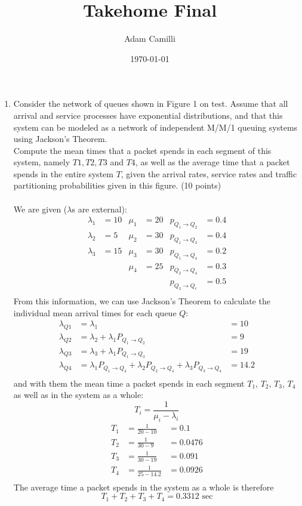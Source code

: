 \documentclass[12pt]{article}
\begin{document}
\title{Takehome Final}
\author{Adam Camilli}
\date{\today}
\maketitle

\begin{enumerate}

\item Consider the network of queues shown in Figure 1 on test. Assume that all arrival and service processes have exponential distributions, and that this system can be modeled as a network of independent M/M/1 queuing systems using Jackson's Theorem. \\
Compute the mean times that a packet spends in each segment of this system, namely $T1 ,T2, T3$ and $T4$,  as well as the average time that a packet spends in the entire system $T$, 
given the arrival rates, service rates and traffic partitioning probabilities given in this figure. (10 points) \\ \\
We are given ($\lambda$s are external):
\begin{align*}
   \lambda_1 &= 10 & \mu_1 &= 20 & p_{Q_1 \rightarrow Q_2} &= 0.4 \\
   \lambda_2 &= 5 & \mu_2 &= 30 & p_{Q_1 \rightarrow Q_3} &= 0.4 \\
   \lambda_3 &= 15 & \mu_3 &= 30 & p_{Q_1 \rightarrow Q_4} &= 0.2 \\
             &\text{}  & \mu_4 &= 25 & p_{Q_2 \rightarrow Q_4} &= 0.3 \\
             &\text{}  & &\text{} &  p_{Q_3 \rightarrow Q_r} &= 0.5 \\
\end{align*}
From this information, we can use Jackson's Theorem to calculate the individual mean arrival times for each queue $Q$:
\begin{align*}
  \lambda_{Q1} &= \lambda_1 &= 10 \\
  \lambda_{Q2} &= \lambda_2 + \lambda_1P_{Q_1 \rightarrow Q_2} &= 9 \\
  \lambda_{Q3} &= \lambda_3 + \lambda_1P_{Q_1 \rightarrow Q_3} &= 19 \\
  \lambda_{Q4} &= \lambda_1P_{Q_1 \rightarrow Q_4} + \lambda_2P_{Q_2 \rightarrow Q_4} + \lambda_3P_{Q_3 \rightarrow Q_4} &= 14.2 \\
\end{align*}
and with them the mean time a packet spends in each segment $T_1$, $T_2$, $T_3$, $T_4$ as well as in the system as a whole:
\[ T_i = \frac{1}{\mu_i - \lambda_i} \]
\begin{align*}
  T_1 &= \frac{1}{20-10} &= 0.1 \\
  T_2 &= \frac{1}{30-9} &= 0.0476 \\
  T_3 &= \frac{1}{30-19} &= 0.091 \\
  T_4 &= \frac{1}{25-14.2} &= 0.0926 \\
\end{align*}
The average time a packet spends in the system as a whole is therefore
\[ T_1 + T_2 + T_3 + T_4 = 0.3312 \text{ sec} \]


\end{enumerate}
\end{document}
